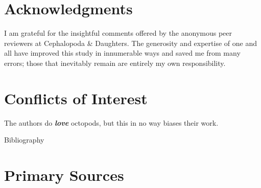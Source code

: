 \documentclass[
  12pt,
  a4paper,
  oneside]{scrbook}
\begin{document}
\hypertarget{acknowledgments}{%
\chapter*{Acknowledgments}\label{acknowledgments}}

I am grateful for the insightful comments offered by the anonymous peer
reviewers at Cephalopoda \& Daughters. The generosity and expertise of
one and all have improved this study in innumerable ways and saved me
from many errors; those that inevitably remain are entirely my own
responsibility.

\hypertarget{conflicts-of-interest}{%
\chapter*{Conflicts of Interest}\label{conflicts-of-interest}}

The authors do \textbf{\emph{love}} octopods, but this in no way biases
their work.

Bibliography

\protect\hypertarget{scriv32}{}{}

\hypertarget{primary-sources}{%
\chapter*{Primary Sources}\label{primary-sources}}

\protect\hypertarget{scriv33}{}{}
\end{document}
